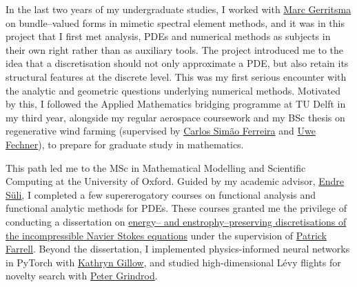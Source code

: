 \documentclass[a4paper,10pt]{article}
\newcommand{\subsectitle}[1]{\noindent{\color{brick}\fontsize{15}{17}\selectfont #1}\par\vspace{2pt}}
\newcommand{\clink}[2]{\textcolor{linkcol}{\href{#1}{#2}}}
\begin{document}
\vspace{5pt}
In the last two years of my undergraduate studies, I worked with \textcolor{midnight}{\href{https://www.tudelft.nl/en/staff/m.i.gerritsma/}{Marc Gerritsma}} on bundle--valued forms in
mimetic spectral element methods, and it was in this project that I first met analysis, PDEs and numerical methods as subjects in their own right rather than as auxiliary tools.
The project introduced me to the idea that a discretisation should not only approximate a PDE, but also retain its structural features at the discrete level.
This was my first serious encounter with the analytic and geometric questions underlying numerical methods.
Motivated by this, I followed the Applied Mathematics bridging programme at TU Delft in my third
year, alongside my regular aerospace coursework and my BSc thesis on regenerative wind farming
(supervised by \textcolor{midnight}{\href{https://www.tudelft.nl/en/ae/organisation/dean-faculty-of-aerospace-engineering/inauguration-henri-werij/carlos}{Carlos Sim\~{a}o Ferreira}} and
\textcolor{midnight}{\href{https://www.tudelft.nl/staff/u.fechner.1/}{Uwe Fechner}}), to prepare for
graduate study in mathematics.

\vspace{10pt}
\subsectitle{Graduate Studies}
This path led me to the MSc in Mathematical Modelling and Scientific Computing at the University of
Oxford. Guided by my academic advisor,
\textcolor{midnight}{\href{https://people.maths.ox.ac.uk/suli/}{Endre S\"uli}}, I completed a few
supererogatory courses on functional analysis and functional analytic methods for PDEs. These
courses granted me the privilege of conducting a dissertation on
\clink{https://matinshams.me/assets/dissertation.pdf}{energy– and
enstrophy–preserving discretisations of the incompressible Navier Stokes equations} under the
supervision of
\textcolor{midnight}{\href{https://pefarrell.org/}{Patrick Farrell}}.
Beyond the dissertation, I implemented physics-informed neural networks in PyTorch with
\textcolor{midnight}{\href{https://www.maths.ox.ac.uk/people/kathryn.gillow}{Kathryn Gillow}}, and
studied high-dimensional L\'evy flights for novelty search with
\textcolor{midnight}{\href{https://www.maths.ox.ac.uk/people/peter.grindrod}{Peter Grindrod}}.
\end{document}

